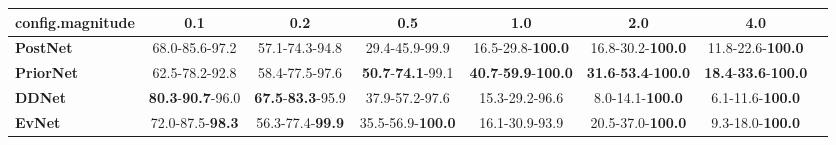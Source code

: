 \begin{tabular}{lccccccc}
\toprule
\textbf{config.magnitude} &                               0.1 &                               0.2 &                               0.5 &                                         1.0 &                                         2.0 &                                         4.0 \\
\midrule
\textbf{PostNet } &                    68.0-85.6-97.2 &                    57.1-74.3-94.8 &                    29.4-45.9-99.9 &                    16.5-29.8-\textbf{100.0} &                    16.8-30.2-\textbf{100.0} &                    11.8-22.6-\textbf{100.0} \\
\textbf{PriorNet} &                    62.5-78.2-92.8 &                    58.4-77.5-97.6 &  \textbf{50.7}-\textbf{74.1}-99.1 &  \textbf{40.7}-\textbf{59.9}-\textbf{100.0} &  \textbf{31.6}-\textbf{53.4}-\textbf{100.0} &  \textbf{18.4}-\textbf{33.6}-\textbf{100.0} \\
\textbf{DDNet   } &  \textbf{80.3}-\textbf{90.7}-96.0 &  \textbf{67.5}-\textbf{83.3}-95.9 &                    37.9-57.2-97.6 &                              15.3-29.2-96.6 &                     8.0-14.1-\textbf{100.0} &                     6.1-11.6-\textbf{100.0} \\
\textbf{EvNet   } &           72.0-87.5-\textbf{98.3} &           56.3-77.4-\textbf{99.9} &          35.5-56.9-\textbf{100.0} &                              16.1-30.9-93.9 &                    20.5-37.0-\textbf{100.0} &                     9.3-18.0-\textbf{100.0} \\
\bottomrule
\end{tabular}
